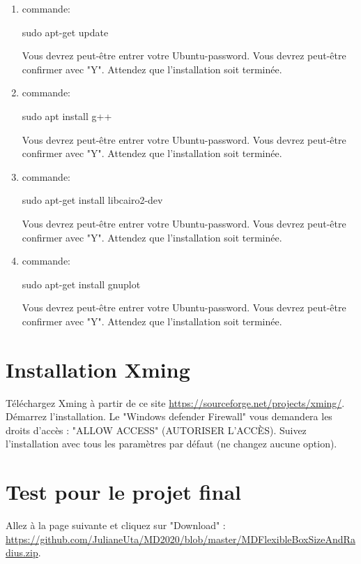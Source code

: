 \documentclass{article}
\begin{document}
\begin{enumerate}
\item commande:
\begin{tcolorbox}[width=\textwidth,colback={blue},title={ubuntu terminal},outer arc=0mm,colupper=white]    
    sudo apt-get update
\end{tcolorbox}
Vous devrez peut-être entrer votre Ubuntu-password. Vous devrez peut-être confirmer avec "Y". Attendez que l'installation soit terminée. 
\item commande:
\begin{tcolorbox}[width=\textwidth,colback={blue},title={ubuntu terminal},outer arc=0mm,colupper=white]    
    sudo apt install g++
\end{tcolorbox}
Vous devrez peut-être entrer votre Ubuntu-password. Vous devrez peut-être confirmer avec "Y". Attendez que l'installation soit terminée. 
\item commande:
\begin{tcolorbox}[width=\textwidth,colback={blue},title={ubuntu terminal},outer arc=0mm,colupper=white]    
    sudo apt-get install libcairo2-dev
\end{tcolorbox}
Vous devrez peut-être entrer votre Ubuntu-password. Vous devrez peut-être confirmer avec "Y". Attendez que l'installation soit terminée. 
\item commande:
\begin{tcolorbox}[width=\textwidth,colback={blue},title={ubuntu terminal},outer arc=0mm,colupper=white]    
    sudo apt-get install gnuplot
\end{tcolorbox}
Vous devrez peut-être entrer votre Ubuntu-password. Vous devrez peut-être confirmer avec "Y". Attendez que l'installation soit terminée. 
\end{enumerate}

\section{Installation Xming}
Téléchargez Xming à partir de ce site \href{https://sourceforge.net/projects/xming/}{https://sourceforge.net/projects/xming/}. Démarrez l'installation. Le "Windows defender Firewall" vous demandera les droits d'accès : "ALLOW ACCESS" (AUTORISER L'ACCÈS). Suivez l'installation avec tous les paramètres par défaut (ne changez aucune option).

\section{Test pour le projet final}
Allez à la page suivante et cliquez sur "Download" : \\ \href{https://github.com/JulianeUta/MD2020/blob/master/MDFlexibleBoxSizeAndRadius.zip}{https://github.com/JulianeUta/MD2020/blob/master/MDFlexibleBoxSizeAndRadius.zip}.
\end{document}
